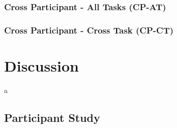 \documentclass[11pt]{article}
\begin{document}
		\subsubsection{Cross Participant - All Tasks (CP-AT)}
		\begin{figure}
		\centering
		\caption{}
		\label{fig:cp-at}
		\end{figure} 
		
		\subsubsection{Cross Participant - Cross Task (CP-CT)}
		\begin{figure}
		\centering
		\caption{}
		\label{fig:cp-ct}
		\end{figure} 

		
\section{Discussion}
a


	\subsection{Participant Study}
	\begin{table}[]
		\caption[Performance Difference Between Conditions]{Mean Performance Difference Between Conditions}
		\centering
		\label{tab:perf-diff}
	\end{table}
	
	\begin{table}[]
		\caption[NASA-TLX Difference Between Conditions]{Mean NASA-TLX Difference Between Conditions}
		\centering
		\label{tab:tlx-diff}
	\end{table}
		
\end{document}
